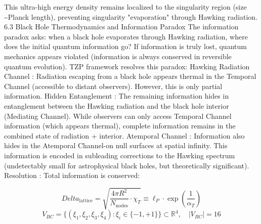 
\begin{tzpsnapshot}
\end{tzpsnapshot}

This ultra-high energy density remains localized to the singularity region (size \textasciitilde{}Planck length), preventing singularity "evaporation" through Hawking radiation. 6.3 Black Hole Thermodynamics and Information Paradox The information paradox asks: when a black hole evaporates through Hawking radiation, where does the initial quantum information go? If information is truly lost, quantum mechanics appears violated (information is always conserved in reversible quantum evolution). TZP framework resolves this paradox: Hawking Radiation Channel : Radiation escaping from a black hole appears thermal in the Temporal Channel (accessible to distant observers). However, this is only partial information. Hidden Entanglement : The remaining information hides in entanglement between the Hawking radiation and the black hole interior (Mediating Channel). While observers can only access Temporal Channel information (which appears thermal), complete information remains in the combined state of radiation + interior. Atemporal Channel : Information also hides in the Atemporal Channel-on null surfaces at spatial infinity. This information is encoded in subleading corrections to the Hawking spectrum (undetectably small for astrophysical black holes, but theoretically significant). Resolution : Total information is conserved:

\[
Delta_{\text{lattice}} = \sqrt{\frac{4\pi R^2}{N_{\text{nodes}}} \cdot \chi_T} \equiv \ell_P \cdot \exp\left( \frac{1}{\alpha_T} \right)
\]
\[
V_{BC} = \{ (\xi_1, \xi_2, \xi_3, \xi_4) : \xi_i \in \{ -1, +1 \} \} \subset \mathbb{R}^4, \quad |V_{BC}| = 16
\]

